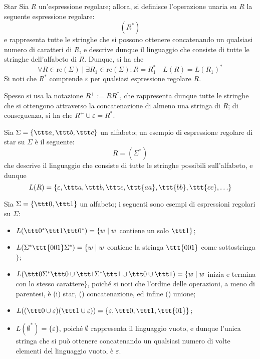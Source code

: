 \documentclass[a4paper, 12pt]{report}
\begin{document}
    \begin{frameddefn}{Star}
        Sia $R$ un'espressione regolare; allora, si definisce l'operazione unaria  su $R$ la seguente espressione regolare: $$(R^*)$$ e rappresenta tutte le stringhe che si possono ottenere concatenando un qualsiasi numero di caratteri di $R$, e descrive dunque il linguaggio che consiste di tutte le stringhe dell'alfabeto di $R$. Dunque, si ha che $$\forall R \in \mathrm{re}(\Sigma) \mid \exists R_1 \in \mathrm{re}(\Sigma) : R = R_1^* \quad L(R) = L(R_1)^*$$ Si noti che $R^*$ comprende $\varepsilon$ per qualsiasi espressione regolare $R$.

        Spesso si usa la notazione $R^+ := RR^*$, che rappresenta dunque tutte le stringhe che si ottengono attraverso la concatenazione di almeno una stringa di $R$; di conseguenza, si ha che $R^+ \cup \varepsilon = R^*$.
    \end{frameddefn}

    \begin{example}[Star]
        Sia $\Sigma = \{\ttt a, \ttt b, \ttt c\}$ un alfabeto; un esempio di espressione regolare di star su $\Sigma$ è il seguente: $$R = (\Sigma^*)$$ che descrive il linguaggio che consiste di tutte le stringhe possibili sull'alfabeto, e dunque $$L(R) = \{\varepsilon, \ttt a, \ttt b, \ttt c, \ttt{aa}, \ttt{bb}, \ttt{cc}, \ldots\}$$
    \end{example}

    \begin{example}
        Sia $\Sigma = \{\ttt 0, \ttt 1\}$ un alfabeto; i seguenti sono esempi di espressioni regolari su $\Sigma$:
        
        \begin{itemize}
            \item $L(\ttt 0 ^* \ttt 1 \ttt 0 ^*) = \{w \mid w$ contiene un solo $\ttt 1 \}$;
            \item $L(\Sigma ^* \ttt{001} \Sigma ^*) = \{ w \mid w$ contiene la stringa $\ttt{001}$ come sottostringa$\}$;
            \item $L(\ttt 0 \Sigma ^* \ttt 0 \cup \ttt 1 \Sigma ^* \ttt 1 \cup \ttt 0 \cup \ttt 1) = \{w \mid w$ inizia e termina con lo stesso carattere$\}$, poiché si noti che l'ordine delle operazioni, a meno di parentesi, è (\tit i) star, () concatenazione, ed infine () unione;
            \item $L((\ttt 0 \cup \varepsilon) (\ttt 1 \cup \varepsilon)) = \{\varepsilon, \ttt 0, \ttt 1, \ttt{01}\}$;
            \item $L(\emptyset ^*) = \{ \varepsilon \}$, poiché $\emptyset$ rappresenta il linguaggio vuoto, e dunque l'unica stringa che si può ottenere concatenando un qualsiasi numero di volte elementi del linguaggio vuoto, è $\varepsilon$.
        \end{itemize}
    \end{example}
\end{document}
